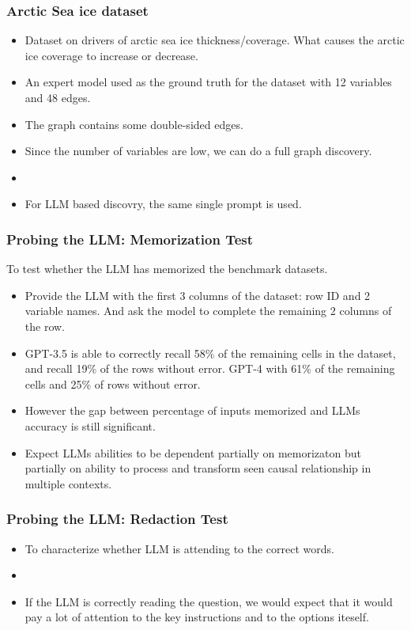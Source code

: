 \documentclass{beamer}
\begin{document}
\begin{frame}
	\frametitle{Arctic Sea ice dataset}
	\begin{itemize}
		\item Dataset on drivers of arctic sea ice thickness/coverage. 
			What causes the arctic ice coverage to increase or decrease.
		\item An expert model used as the ground truth for the dataset with 
			12 variables and 48 edges.
		\item The graph contains some double-sided edges.
		\item Since the number of variables are low, we can do a full 
			graph discovery.
		\item {}
		\item For LLM based discovry, the same single prompt is used.
	\end{itemize}
\end{frame}

\begin{frame}
	\frametitle{Probing the LLM: Memorization Test}
	To test whether the LLM has memorized the benchmark datasets.
	\begin{itemize}
		\item Provide the LLM with the first 3 columns of the dataset:
			row ID and 2 variable names. And ask the model to
			complete the remaining 2 columns of the row.
		\item GPT-3.5 is able to correctly recall 58\% of the remaining
			cells in the dataset, and recall 19\% of the rows
			without error. GPT-4 with 61\% of the remaining cells
			and 25\% of rows without error.
		\item However the gap between percentage of inputs memorized and LLMs
			accuracy is still significant.
		\item Expect LLMs abilities to be dependent partially on memorizaton
			but partially on ability to process and transform seen
			causal relationship in multiple contexts.
	\end{itemize}
\end{frame}

\begin{frame}
	\frametitle{Probing the LLM: Redaction Test}
	\begin{itemize}
		\item To characterize whether LLM is attending to the correct words.
		\item {}
		\item If the LLM is correctly reading the question, we would expect
			that it would pay a lot of attention to the key instructions and
			to the options iteself.
	\end{itemize}
\end{frame}
\end{document}
